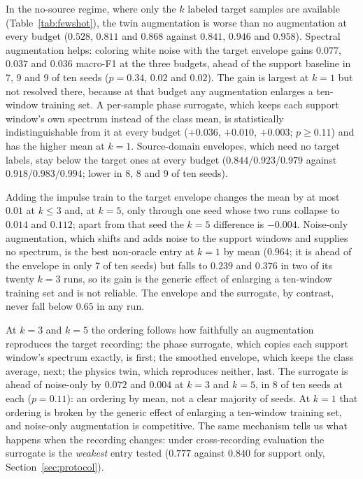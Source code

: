 \documentclass[preprint,12pt]{elsarticle}
\begin{document}
In the no-source regime, where only the $k$ labeled target samples are
available (Table~\ref{tab:fewshot}), the twin augmentation is worse than no
augmentation at every budget ($0.528$, $0.811$ and $0.868$ against $0.841$,
$0.946$ and $0.958$). Spectral
augmentation helps: coloring white noise with the target envelope gains
$0.077$, $0.037$ and $0.036$ macro-F1 at the three budgets, ahead of the
support baseline in 7, 9 and 9 of ten seeds ($p=0.34$, $0.02$ and $0.02$).
The gain is largest at $k=1$ but not resolved there, because at that budget
any augmentation enlarges a ten-window training set. A per-sample phase surrogate,
which keeps each support window's own spectrum instead of the class mean, is
statistically indistinguishable from it at every budget ($+0.036$, $+0.010$,
$+0.003$; $p\ge0.11$) and has the higher mean at $k=1$. Source-domain
envelopes, which need no target labels, stay below the target ones at every
budget ($0.844$/$0.923$/$0.979$ against $0.918$/$0.983$/$0.994$; lower in 8, 8 and 9
of ten seeds).

Adding the impulse train to the
target envelope changes the mean by at most $0.01$ at $k\le3$ and, at $k=5$,
only through one seed whose two runs collapse to $0.014$ and $0.112$; apart
from that seed the $k=5$ difference is $-0.004$. Noise-only augmentation, which
shifts and adds noise to the support windows and supplies no spectrum, is the
best non-oracle entry at $k=1$ by mean ($0.964$; it is ahead of the envelope
in only 7 of ten seeds) but falls to $0.239$ and $0.376$ in
two of its twenty $k=3$ runs, so its gain is the generic effect of enlarging a
ten-window training set and is not reliable. The envelope and the surrogate,
by contrast, never fall below $0.65$ in any run.

At $k=3$ and $k=5$ the ordering follows how faithfully an augmentation
reproduces the target recording: the phase surrogate, which copies each
support window's spectrum exactly, is first; the smoothed envelope, which
keeps the class average, next; the physics twin, which reproduces neither,
last. The surrogate is ahead of noise-only by $0.072$ and $0.004$ at $k=3$ and
$k=5$, in 8 of ten seeds at each ($p=0.11$): an ordering by mean, not a
clear majority of seeds. At $k=1$ that ordering is broken by the generic effect of enlarging a
ten-window training set, and noise-only augmentation is competitive. The
same mechanism tells us what happens when the recording changes: under
cross-recording evaluation the surrogate is the \emph{weakest} entry tested
($0.777$ against $0.840$ for support only, Section~\ref{sec:protocol}).
\end{document}
